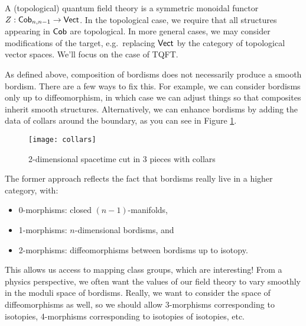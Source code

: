 A (topological) quantum field theory is a symmetric monoidal functor $Z: \mathsf{Cob}_{n,n-1} \to \mathsf{Vect}$.
In the topological case, we require that all structures appearing in $\mathsf{Cob}$ are topological.
In more general cases, we may consider modifications of the target, e.g.\ replacing $\mathsf{Vect}$ by the category of topological vector spaces.
We'll focus on the case of TQFT.

As defined above, composition of bordisms does not necessarily produce a smooth bordism.
There are a few ways to fix this.
For example, we can consider bordisms only up to diffeomorphism, in which case we can adjust things so that composites inherit smooth structures.
Alternatively, we can enhance bordisms by adding the data of collars around the boundary, as you can see in Figure \ref{fig:collars}.


\begin{figure}[h]
\centering
\texttt{[image: collars]}
\caption{2-dimensional spacetime cut in 3 pieces with collars}
\label{fig:collars}
\end{figure}

The former approach reflects the fact that bordisms really live in a higher category, with:
\begin{itemize}
	\item 0-morphisms: closed $(n-1)$-manifolds,
	\item 1-morphisms: $n$-dimensional bordisms, and
	\item 2-morphisms: diffeomorphisms between bordisms up to isotopy.
\end{itemize}
This allows us access to mapping class groups, which are interesting!
From a physics perspective, we often want the values of our field theory to vary smoothly in the moduli space of bordisms.
Really, we want to consider the space of diffeomorphisms as well, so we should allow 3-morphisms corresponding to isotopies, 4-morphisms corresponding to isotopies of isotopies, etc.

